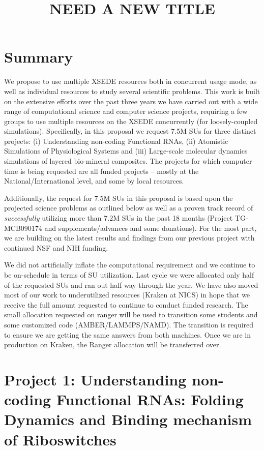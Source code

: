 \documentclass[a4paper,11pt]{article}
\begin{document}
\title{\large NEED A NEW TITLE}

\date{}

\maketitle
 
\section{Summary}
We propose to use multiple XSEDE resources both in concurrent usage mode, as well as individual resources to study several scientific problems. This work is built on the extensive efforts over the past three years we have carried out with a wide range of computational science and computer science projects, requiring a few groups to use multiple resources on the XSEDE concurrently (for loosely-coupled simulations).  Specifically, in this proposal we request 7.5M SUs for three distinct projects: (i) Understanding non-coding Functional RNAs, (ii) Atomistic Simulations of Physiological Systems and (iii) Large-scale molecular dynamics simulations of layered bio-mineral composites. The projects for which computer time is being requested are all funded projects -- mostly at the National/International level, and some by local resources.

Additionally, the request for 7.5M SUs in this proposal is based upon the projected science problems as outlined below as well as a proven track record of {\it successfully} utilizing more than 7.2M SUs in the past 18 months (Project TG-MCB090174 and supplements/advances and some donations). For the most part, we are building on the latest results and findings from our previous project with continued NSF and NIH funding.

We did not artificially inflate the computational requirement and we continue to be on-schedule in terms of SU utilization. Last cycle we were allocated only half of the requested SUs and ran out half way through the year. We have also moved most of our work to underutilized resources (Kraken at NICS) in hope that we receive the full amount requested to continue to conduct funded research. The small allocation requested on ranger will be used to transition some students and some customized code (AMBER/LAMMPS/NAMD). The transition is required to ensure we are getting the same answers from both machines. Once we are in production on Kraken, the Ranger allocation will be transferred over.

\section{Project 1: Understanding non-coding Functional RNAs: 
Folding Dynamics and Binding mechanism of Riboswitches}
\end{document}
